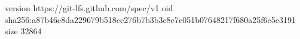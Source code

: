 version https://git-lfs.github.com/spec/v1
oid sha256:a87b46e8da229679b518ce276b7b3b3c8e7c051b07648217f680a25f6e5e3191
size 32864
